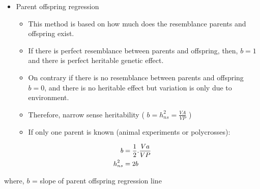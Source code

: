 \documentclass[11pt,ignorenonframetext,aspectratio=169]{beamer}
\providecommand{\tightlist}{%
  \setlength{\itemsep}{0pt}\setlength{\parskip}{0pt}}
\begin{document}
\begin{frame}{}
\protect\hypertarget{section-12}{}
\begin{itemize}
\tightlist
\item
  Parent offspring regression

  \begin{itemize}
  \tightlist
  \item
    This method is based on how much does the resemblance parents and
    offspring exist.
  \item
    If there is perfect resemblance between parents and offspring, then,
    \(b = 1\) and there is perfect heritable genetic effect.
  \item
    On contrary if there is no resemblance between parents and offspring
    \(b = 0\), and there is no heritable effect but variation is only
    due to environment.
  \item
    Therefore, narrow sense heritability (
    \(b = h_{ns}^2 = \frac{VA}{VP}\) )
  \item
    If only one parent is known (animal experiments or polycrosses):
  \end{itemize}
\end{itemize}

\[
\small
\begin{aligned}
b &= \frac{1}{2}.\frac{Va}{VP}\\
h_{ns}^2 &= 2b
\end{aligned}
\]

where, \(b\) = slope of parent offspring regression line
\end{frame}
\end{document}
